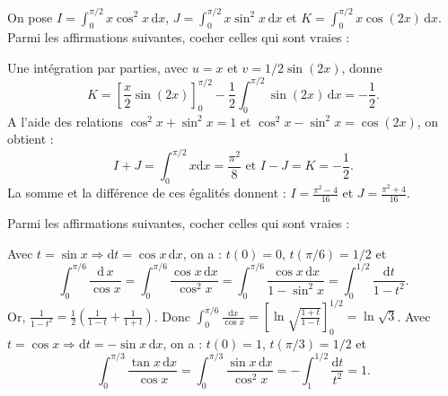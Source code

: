 \begin{question}
On pose $\displaystyle I=\int _0^{\pi/2}x\cos ^2x\, \mathrm{d}x$, $\displaystyle J=\int _0^{\pi/2}x\sin ^2x\, \mathrm{d}x$ et $\displaystyle K=\int _0^{\pi/2}x\cos (2x)\, \mathrm{d}x$. Parmi les affirmations suivantes, cocher celles qui sont vraies :
\begin{answers}  
\end{answers}
\vskip2mm
\begin{explanations}
Une intégration par parties, avec $u=x$ et $v=1/2\sin (2x)$, donne
$$K=\left[\frac{x}{2}\sin (2x)\right]_0^{\pi/2}-\frac{1}{2}\int _0^{\pi/2} \sin (2x)\, \mathrm{d}x=-\frac{1}{2}.$$
A l'aide des relations $\cos ^2x+\sin ^2x=1$ et  $\cos ^2x-\sin ^2x=\cos (2x)$, on obtient :
$$I+J=\int _0^{\pi/2}x\mathrm{d}x=\frac{\pi ^2}{8}\mbox{ et }I-J=K=-\frac{1}{2}.$$
La somme et la différence de ces égalités donnent : $\displaystyle I=\frac{\pi ^2-4}{16}$ et $\displaystyle J=\frac{\pi ^2+4}{16}$.
\end{explanations}
\end{question}


\begin{question}
Parmi les affirmations suivantes, cocher celles qui sont vraies :
\begin{answers}
\end{answers}
\begin{explanations}
Avec $t=\sin x\Rightarrow \mathrm{d}t=\cos x\, \mathrm{d}x$, on a : $t(0)=0$, $t(\pi/6)=1/2$ et 
$$\displaystyle \int _0^{\pi/6}\frac{\mathrm{d}\, x}{\cos x}=\int _0^{\pi/6}\frac{\cos x\, \mathrm{d}x}{\cos ^2x}=\int _0^{\pi/6}\frac{\cos x\, \mathrm{d}x}{1-\sin ^2x}=\int _0^{1/2}\frac{\mathrm{d}t}{1-t^2}.$$
Or, $\displaystyle \frac{1}{1-t^2}=\frac{1}{2}\left(\frac{1}{1-t}+\frac{1}{1+t}\right)$. Donc $\displaystyle \int _0^{\pi/6}\frac{\mathrm{d}x}{\cos x}=\left[\ln \sqrt{\frac{1+t}{1-t}}\right]_0^{1/2}=\ln \sqrt{3}$.
\vskip0mm
Avec $t=\cos x\Rightarrow \mathrm{d}t=-\sin x\, \mathrm{d}x$, on a : $t(0)=1$, $t(\pi/3)=1/2$ et 
$$\displaystyle \int _{0}^{\pi/3}\frac{\tan x\, \mathrm{d}x}{\cos x}=\int _{0}^{\pi/3}\frac{\sin x\, \mathrm{d}x}{\cos ^2x}=-\int _1^{1/2}\frac{\mathrm{d}t}{t^2}=1.$$
\end{explanations}
\end{question}


